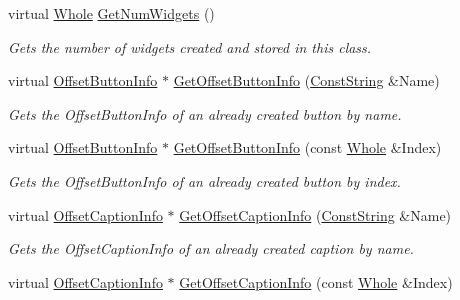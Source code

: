 \begin{DoxyCompactItemize}
virtual \hyperlink{namespaceMezzanine_adcbb6ce6d1eb4379d109e51171e2e493}{Whole} \hyperlink{classMezzanine_1_1UI_1_1RenderableContainerWidget_a0f37f929679f1472ef23c3cf8e4c38bc}{GetNumWidgets} ()
\begin{DoxyCompactList}\small\item\em Gets the number of widgets created and stored in this class. \item\end{DoxyCompactList}\item 
virtual \hyperlink{structMezzanine_1_1UI_1_1ResizingInfo}{OffsetButtonInfo} $\ast$ \hyperlink{classMezzanine_1_1UI_1_1RenderableContainerWidget_ae04b7304acf969c7b5b11417268bf458}{GetOffsetButtonInfo} (\hyperlink{namespaceMezzanine_a63cd699ac54b73953f35ec9cfc05e506}{ConstString} \&Name)
\begin{DoxyCompactList}\small\item\em Gets the OffsetButtonInfo of an already created button by name. \item\end{DoxyCompactList}\item 
virtual \hyperlink{structMezzanine_1_1UI_1_1ResizingInfo}{OffsetButtonInfo} $\ast$ \hyperlink{classMezzanine_1_1UI_1_1RenderableContainerWidget_ac4842f3ccc449a30397041556aebeaa5}{GetOffsetButtonInfo} (const \hyperlink{namespaceMezzanine_adcbb6ce6d1eb4379d109e51171e2e493}{Whole} \&Index)
\begin{DoxyCompactList}\small\item\em Gets the OffsetButtonInfo of an already created button by index. \item\end{DoxyCompactList}\item 
virtual \hyperlink{structMezzanine_1_1UI_1_1ResizingInfo}{OffsetCaptionInfo} $\ast$ \hyperlink{classMezzanine_1_1UI_1_1RenderableContainerWidget_a2de9ad86228863ce264137dcf0e98ec5}{GetOffsetCaptionInfo} (\hyperlink{namespaceMezzanine_a63cd699ac54b73953f35ec9cfc05e506}{ConstString} \&Name)
\begin{DoxyCompactList}\small\item\em Gets the OffsetCaptionInfo of an already created caption by name. \item\end{DoxyCompactList}\item 
virtual \hyperlink{structMezzanine_1_1UI_1_1ResizingInfo}{OffsetCaptionInfo} $\ast$ \hyperlink{classMezzanine_1_1UI_1_1RenderableContainerWidget_a6bb021b2eec02f089672f624ce4f0ffb}{GetOffsetCaptionInfo} (const \hyperlink{namespaceMezzanine_adcbb6ce6d1eb4379d109e51171e2e493}{Whole} \&Index)

\end{DoxyCompactItemize}
